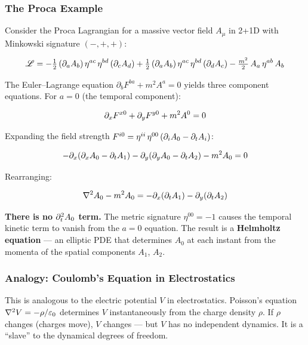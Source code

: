 \subsubsection{The Proca Example}
\label{sec:cf-proca}

Consider the Proca Lagrangian for a massive vector field $A_\mu$ in 2+1D with
Minkowski signature $(-,+,+)$:

\begin{equation}
  \mathscr{L} = -\tfrac{1}{2}\,(\partial_a A_b)\,\eta^{ac}\,\eta^{bd}\,(\partial_c A_d)
       + \tfrac{1}{2}\,(\partial_a A_b)\,\eta^{ac}\,\eta^{bd}\,(\partial_d A_c)
       - \tfrac{m^2}{2}\,A_a\,\eta^{ab}\,A_b
  \label{eq:proca-lagrangian}
\end{equation}

The Euler--Lagrange equation $\partial_b F^{ba} + m^2 A^a = 0$ yields three component
equations. For $a = 0$ (the temporal component):

\begin{equation}
  \partial_x F^{x0} + \partial_y F^{y0} + m^2 A^0 = 0
  \label{eq:proca-temporal}
\end{equation}

Expanding the field strength $F^{i0} = \eta^{ii}\,\eta^{00}\,(\partial_i A_0 - \partial_t A_i)$:

\begin{equation}
  -\partial_x(\partial_x A_0 - \partial_t A_1) - \partial_y(\partial_y A_0 - \partial_t A_2) - m^2 A_0 = 0
  \label{eq:proca-expanded}
\end{equation}

Rearranging:

\begin{equation}
  \nabla^2 A_0 - m^2 A_0 = -\partial_x(\partial_t A_1) - \partial_y(\partial_t A_2)
  \label{eq:proca-helmholtz}
\end{equation}

\textbf{There is no $\partial_t^2 A_0$ term.} The metric signature $\eta^{00} = -1$ causes
the temporal kinetic term to vanish from the $a = 0$ equation. The result is a
\textbf{Helmholtz equation} --- an elliptic PDE that determines $A_0$ at each instant
from the momenta of the spatial components $A_1$, $A_2$.

\subsubsection{Analogy: Coulomb's Equation in Electrostatics}
\label{sec:cf-coulomb}

This is analogous to the electric potential $V$ in electrostatics. Poisson's
equation $\nabla^2 V = -\rho/\varepsilon_0$ determines $V$ instantaneously from the charge density
$\rho$. If $\rho$ changes (charges move), $V$ changes --- but $V$ has no independent
dynamics. It is a ``slave'' to the dynamical degrees of freedom.


